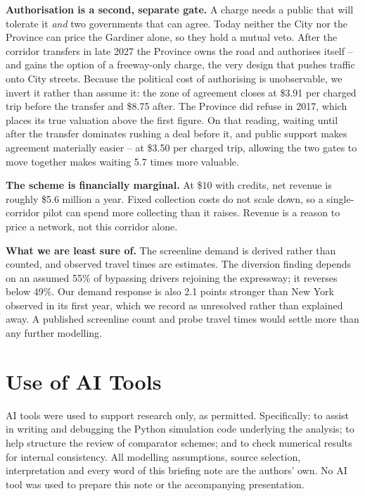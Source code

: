\documentclass[11pt,letterpaper]{article}
\begin{document}
\textbf{Authorisation is a second, separate gate.} A charge needs a public that
will tolerate it \emph{and} two governments that can agree. Today neither the
City nor the Province can price the Gardiner alone, so they hold a mutual veto.
After the corridor transfers in late 2027 the Province owns the road and
authorises itself -- and gains the option of a freeway-only charge, the very
design that pushes traffic onto City streets. Because the political cost of
authorising is unobservable, we invert it rather than assume it: the zone of
agreement closes at \$3.91 per charged trip before the transfer and \$8.75
after. The Province did refuse in 2017, which places its true valuation above
the first figure. On that reading, waiting until after the transfer dominates
rushing a deal before it, and public support makes agreement materially easier
-- at \$3.50 per charged trip, allowing the two gates to move together makes
waiting 5.7 times more valuable.

\textbf{The scheme is financially marginal.} At \$10 with credits, net revenue
is roughly \$5.6 million a year. Fixed collection costs do not scale down, so a
single-corridor pilot can spend more collecting than it raises. Revenue is a
reason to price a network, not this corridor alone.

\textbf{What we are least sure of.} The screenline demand is derived rather than
counted, and observed travel times are estimates. The diversion finding depends
on an assumed 55\% of bypassing drivers rejoining the expressway; it reverses
below 49\%. Our demand response is also 2.1 points stronger than New York
observed in its first year, which we record as unresolved rather than explained
away. A published screenline count and probe travel times would settle more than
any further modelling.

\section*{Use of AI Tools}

\begin{singlespace}
\small
AI tools were used to support research only, as permitted. Specifically: to
assist in writing and debugging the Python simulation code underlying the
analysis; to help structure the review of comparator schemes; and to check
numerical results for internal consistency. All modelling assumptions, source
selection, interpretation and every word of this briefing note are the authors'
own. No AI tool was used to prepare this note or the accompanying presentation.
\end{singlespace}
\end{document}
